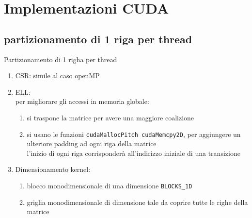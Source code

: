 \documentclass[aspectratio=1610]{beamer}
\newcommand{\vvv}[1]{{\small\texttt{#1}}}
\begin{document}
\section{Implementazioni CUDA}
\subsection{partizionamento di 1 riga per thread}
\begin{frame}{Partizionamento di 1 righa per thread}
	\begin{enumerate}
		\item	CSR:	simile al caso openMP
		\pause
		\item	ELL:	\\
		per migliorare gli accessi in memoria globale:\\
		\begin{enumerate}
			\item 	si traspone la matrice per avere una maggiore coalizione
			\pause
			\item 	si usano le funzioni \vvv{cudaMallocPitch cudaMemcpy2D}, per aggiungere un 
					ulteriore padding ad ogni riga della matrice \\
					\pause
					l'inizio di ogni riga corrisponderà all'indirizzo iniziale di una transizione
		\end{enumerate}
		\pause
		\item	Dimensionamento kernel:	
		\begin{enumerate}
			\item 	blocco monodimensionale di una dimensione \vvv{BLOCKS\_1D}
			\item	griglia monodimensionale di dimensione tale da coprire tutte le righe della matrice 
		\end{enumerate}
	\end{enumerate}
\end{frame}
\end{document}

